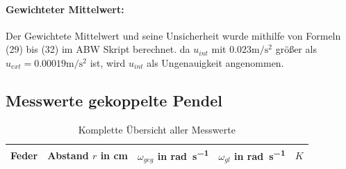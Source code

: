 \documentclass[11pt, a4paper]{article}
\begin{document}
    \paragraph{Gewichteter Mittelwert:}
    Der Gewichtete Mittelwert und seine Unsicherheit wurde mithilfe von
    Formeln (29) bis (32) im ABW Skript\cite{ABW} berechnet. da $u_{int}$ mit $0.023\si{\metre\per\square\second}$
    größer als $u_{ext} = 0.00019\si{\metre\per\square\second}$ ist, wird $u_{int}$ als Ungenauigkeit angenommen.

    \subsection{Messwerte gekoppelte Pendel} \label{kmess}

    \begin{table}[H]
        \label{mess1}
        \centering
        \begin{tabular}{c c c c c}
            Feder & Abstand $r$ in \si{\centi\metre} & $\omega_{geg}$ in \si{\radian\per\second} &
            $\omega_{gl}$ in \si{\radian\per\second} & $K$ \\ \hline
            
            
        \end{tabular}
        \caption{Komplette Übersicht aller Messwerte}
    \end{table}


    
    
\end{document}
